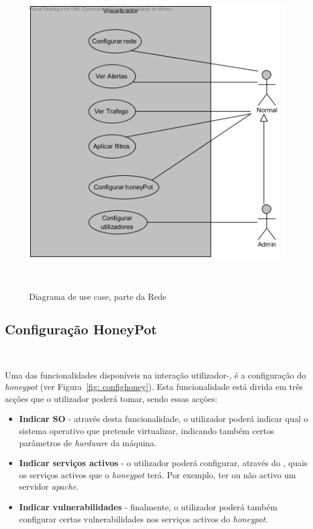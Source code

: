 \begin{figure}[!ht]
	\centering
	\includegraphics[scale=0.80]{images/ucs/Visualizador}
	\caption {Diagrama de use case, parte da Rede}~\label{fig: casodeusovisual}
\end{figure}
\pagebreak

\subsection{\textbf{Configuração HoneyPot}}~\label{subsubsec: confighoney}

Uma das funcionalidades disponíveis na interação utilizador-\visualz, é a configuração do \emph{honeypot} (ver Figura~\ref{fig: confighoney}).
Esta funcionalidade está divida em três acções que o utilizador poderá tomar, sendo essas acções:

\begin{itemize}
 \item \textbf{Indicar SO} - através desta funcionalidade, o utilizador poderá indicar qual o sistema operativo que pretende virtualizar, indicando também certos parâmetros de \emph{hardware} da máquina.
 \item \textbf{Indicar serviços activos} - o utilizador poderá configurar, através do \visualz, quais os serviços activos que o \emph{honeypot} terá. Por exemplo, ter ou não activo um servidor \emph{apache}.
 \item \textbf{Indicar vulnerabilidades} - finalmente, o utilizador poderá também configurar certas vulnerabilidades nos serviços activos do \emph{honeypot}.
\end{itemize}

